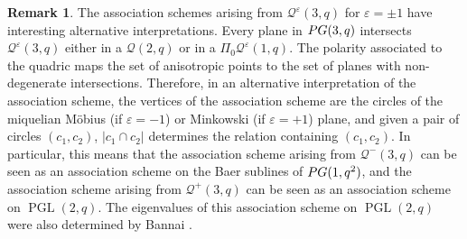 \documentclass[a4paper]{article}
\theoremstyle{definition}
\newtheorem{rmk}[thm]{Remark}
\newcommand{\eps}{\varepsilon}
\newcommand{\pg}{\textnormal{PG}}
\newcommand{\mq}{\mathcal Q}
\DeclareMathOperator{\PGL}{PGL}
\begin{document}
\begin{rmk}
 The association schemes arising from $\mq^\eps(3,q)$ for $\eps = \pm 1$ have interesting alternative interpretations.
 Every plane in $\pg(3,q)$ intersects $\mq^\eps(3,q)$ either in a $\mq(2,q)$ or in a $\Pi_0 \mq^\eps(1,q)$.
 The polarity associated to the quadric maps the set of anisotropic points to the set of planes with non-degenerate intersections.
 Therefore, in an alternative interpretation of the association scheme, the vertices of the association scheme are the circles of the miquelian Möbius (if $\eps=-1$) or Minkowski (if $\eps=+1$) plane, and given a pair of circles $(c_1,c_2)$, $|c_1 \cap c_2|$ determines the relation containing $(c_1, c_2)$.
 In particular, this means that the association scheme arising from $\mq^-(3,q)$ can be seen as an association scheme on the Baer sublines of $\pg(1,q^2)$, and the association scheme arising from $\mq^+(3,q)$ can be seen as an association scheme on $\PGL(2,q)$.
 The eigenvalues of this association scheme on $\PGL(2,q)$ were also determined by Bannai \cite[p.\ 172]{bannai1991}.
\end{rmk}
\end{document}
